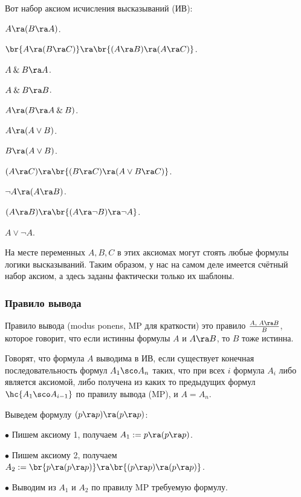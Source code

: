 \documentclass[a4paper,draft]{article}
\let\amper\&
\def\&{\mathbin{\amper}}
\begin{document}
Вот набор аксиом исчисления высказываний (ИВ):

\begin{nums}{-2}
  \item $A \ra (B \ra A)$.
  \item $\br{A \ra (B \ra C)}\ra\br{(A\ra B) \ra (A \ra C)}$.
  \item $A \& B \ra A$.
  \item $A \& B \ra B$.
  \item $A \ra (B\ra A\&B)$.
  \item $A \ra (A \vee B)$.
  \item $B \ra (A \vee B)$.
  \item $(A \ra C) \ra \br{(B \ra C) \ra (A \vee B \ra C)}$.
  \item $\neg A \ra (A \ra B)$.
  \item $(A \ra B) \ra \br{(A \ra \neg B) \ra \neg A}$.
  \item $A\vee \neg A$.
\end{nums}

На месте переменных $A, B, C$ в этих аксиомах могут стоять любые формулы логики высказываний.
Таким образом, у нас на самом деле имеется счётный набор аксиом, а здесь заданы фактически только их шаблоны.

\subsubsection{Правило вывода}

\begin{df}
  Правило вывода (modus ponens, MP для краткости) это правило $\frac{A,\; A \ra B}{B}$, которое говорит,
  что если истинны формулы $A$ и $A \ra B$, то $B$ тоже истинна.
\end{df}

\begin{df}
  Говорят, что формула $A$ выводима в ИВ, если существует конечная последовательность формул $A_1\sco A_n$
  таких, что при всех $i$ формула $A_i$ либо является аксиомой, либо получена из каких то предыдущих формул $\hc{A_1\sco A_{i-1}}$
  по правилу вывода (MP), и $A = A_n$.
\end{df}

\begin{ex}
  Выведем формулу $(p \ra p) \ra (p \ra p)$:\par
  $\bullet$ Пишем аксиому 1, получаем $A_1 := p \ra (p\ra p)$.\par
  $\bullet$ Пишем аксиому 2, получаем $A_2 := \br{p \ra (p\ra p)} \ra \br{(p\ra p) \ra (p\ra p)}$.\par
  $\bullet$ Выводим из $A_1$ и $A_2$ по правилу MP требуемую формулу.
\end{ex}
\end{document}
